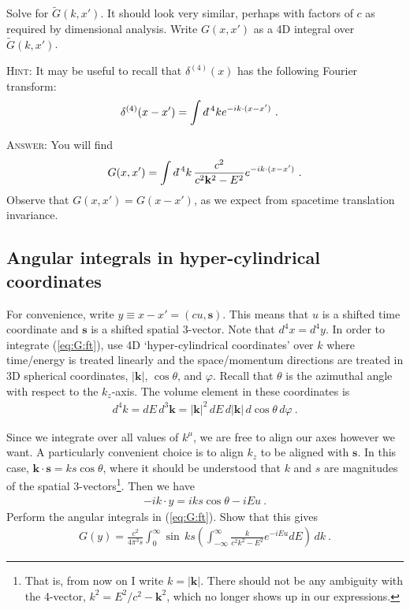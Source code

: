 \documentclass[12pt]{article}
\numberwithin{equation}{section}    %
\renewcommand{\tilde}{\widetilde}   %
\renewcommand{\vec}[1]{\mathbf{#1}} %
\newcommand{\dbar}{d\mkern-6mu\mathchar'26}    %
\begin{document}
Solve for $\tilde G(k,x')$. It should look very similar, perhaps with factors of $c$ as required by dimensional analysis.  Write $G(x,x')$ as a 4D integral over $\tilde G(k,x')$.

\textsc{Hint:} It may be useful to recall that $\delta^{(4)}(x)$ has the following Fourier transform: 
\begin{align}
	\delta^{(4)}(x-x') &= \int \dbar^4 k e^{-ik\cdot (x-x')} \ .
\end{align}

\textsc{Answer:} You will find
\begin{align}
	G(x,x') = \int \dbar^4k \, \frac{c^2}{c^2 \vec k^2 - E^2} e^{-ik\cdot (x-x')} \ .
	\label{eq:G:ft}
\end{align} 
Observe that $G(x,x') = G(x-x')$, as we expect from spacetime translation invariance.



\subsection{Angular integrals in hyper-cylindrical coordinates}

For convenience, write $y \equiv x-x' = (cu,\mathbf{s})$. This means that $u$ is a shifted time coordinate and $\vec s$ is a shifted spatial 3-vector. Note that $d^4x = d^4 y$. In order to integrate (\ref{eq:G:ft}), use 4D `hyper-cylindrical coordinates' over $k$ where time/energy is treated linearly and the space/momentum directions are treated in 3D spherical coordinates, $|\vec k|$, $\cos \theta$, and $\varphi$. Recall that $\theta$ is the azimuthal angle with respect to the $k_z$-axis. The volume element in these coordinates is
\begin{align}
	d^4 k = dE \, d^3\vec k = |\vec k|^2 \,dE \,  d|\vec k| \, d\cos \theta \, d\varphi \ .
\end{align}

Since we integrate over all values of $k^\mu$, we are free to align our axes however we want. A particularly convenient choice is to align $k_z$ to be aligned with $\vec s$. In this case, $\vec k \cdot \vec s = ks \cos \theta$, where it should be understood that $k$ and $s$ are magnitudes of the spatial $3$-vectors\footnote{That is, from now on I write $k = |\vec k|$. There should not be any ambiguity with the 4-vector, $k^2 = E^2/c^2 - \vec k^2$, which no longer shows up in our expressions.}.
%
Then we have
\begin{align}
	-ik\cdot y = i k s \cos \theta  - i E u \ .
\end{align}
Perform the angular integrals in (\ref{eq:G:ft}).  Show that this gives
\begin{align}
	G(y) = \frac{c^2}{4\pi^3 s} \int_0^\infty \sin\, ks 
	\left(
	 \int_{-\infty}^\infty \frac{k}{c^2k^2 - E^2} e^{-iE u} dE
	\right) \, dk \ .
	\label{eq:G:cauchy:P:problem}
\end{align}
\end{document}
